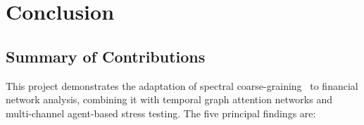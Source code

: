 \chapter{Conclusion}
\label{ch:conclusion}


\section{Summary of Contributions}
\label{sec:summary}

This project demonstrates the adaptation of spectral coarse-graining~\cite{schmidt2024spectral} to financial network analysis, combining it with temporal graph attention networks and multi-channel agent-based stress testing. The five principal findings are:

